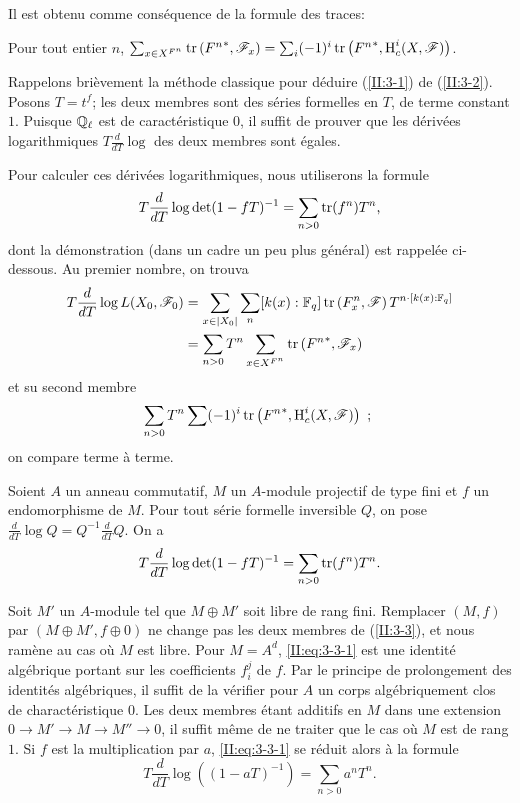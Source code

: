 Il est obtenu comme conséquence de la formule des traces:





\begin{theorem_}\label{II:3-2}
Pour tout entier $n$, 
$\sum_{x\in X^{F^n}} \operatorname{tr}\left({F^n}^*,\mathscr{F}_x\right) = \sum_i (-1)^i \operatorname{tr}\left({F^n}^*,\operatorname{H}_c^i(X,\mathscr{F})\right)$. 
\end{theorem_}





Rappelons brièvement la méthode classique pour déduire (\ref{II:3-1}) 
de (\ref{II:3-2}). Posons $T=t^f$; les deux membres sont des séries formelles 
en $T$, de terme constant $1$. Puisque $\mathbb{Q}_\ell$ est de caractéristique 
$0$, il suffit de prouver que les dérivées logarithmiques 
$T\frac{d}{dT}\log$ des deux membres sont égales. 

Pour calculer ces dérivées logarithmiques, nous utiliserons la formule 
\[
  T \frac{d}{dT}\log\det(1-f T)^{-1} = \sum_{n>0} \operatorname{tr}(f^n) T^n \text{,}
\]
dont la démonstration (dans un cadre un peu plus général) est rappelée 
ci-dessous. Au premier nombre, on trouva 
\begin{align*}
  T\frac{d}{dT}\log L(X_0,\mathscr{F}_0) 
    &= \sum_{x\in |X_0|} \sum_n [k(x):\mathbb{F}_q] \operatorname{tr}\left(F_x^n,\mathscr{F}\right) T^{n\cdot[k(x):\mathbb{F}_q]} \\
    &= \sum_{n>0} T^n \sum_{x\in X^{F^n}} \operatorname{tr}\left({F^n}^*,\mathscr{F}_x\right)
\end{align*}
et su second membre 
\[
  \sum_{n>0} T^n \sum (-1)^i \operatorname{tr}\left({F^n}^*,\operatorname{H}_c^i(X,\mathscr{F})\right) \text{ ; }
\]
on compare terme à terme. 





\begin{proposition_}\label{II:3-3}
Soient $A$ un anneau commutatif, $M$ un $A$-module projectif de type fini et 
$f$ un endomorphisme de $M$. Pour tout série formelle inversible $Q$, on pose 
$\frac{d}{dT}\log Q = Q^{-1}\frac{d}{dT}Q$. On a 
\begin{equation}\label{II:eq:3-3-1}
  T\frac{d}{dT}\log\det(1-f T)^{-1} = \sum_{n>0} \operatorname{tr}(f^n) T^n \text{.}
\end{equation}
\end{proposition_}

Soit $M'$ un $A$-module tel que $M\oplus M'$ soit libre de rang fini. 
Remplacer $(M,f)$ par $(M\oplus M',f\oplus 0)$ ne change pas les deux membres 
de (\ref{II:3-3}), et nous ramène au cas où $M$ est libre. Pour $M=A^d$, 
\eqref{II:eq:3-3-1} est une identité algébrique portant sur les coefficients 
$f_i^j$ de $f$. Par le principe de prolongement des identités algébriques, 
il suffit de la vérifier pour $A$ un corps algébriquement clos de 
charactéristique $0$. Les deux membres étant additifs en $M$ dans une 
extension $0\to M'\to M\to M''\to 0$, il suffit même de ne traiter que le cas 
où $M$ est de rang $1$. Si $f$ est la multiplication par $a$, 
\eqref{II:eq:3-3-1} se réduit alors à la formule 
\[
  T\frac{d}{dT}\log\left((1-a T)^{-1}\right) = \sum_{n>0} a^n T^n \text{.}
\]





